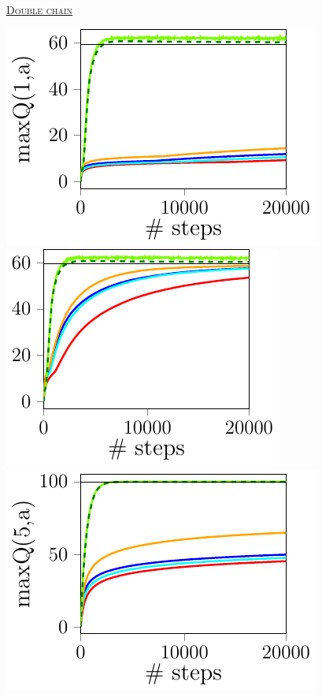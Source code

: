 \documentclass[portrait,a0paper,fontscale=0.312]{baposter}
\newcommand{\listhead}[1] {\textsc{\underline{#1}}}
\begin{document}
\begin{poster}
{\begin{minipage}{0.45\textwidth}
\begin{center}
\begin{minipage}{0.4\textwidth}
    \end{minipage}
  \end{center}
\end{minipage}
\begin{center}
  \listhead{Double chain}\\
  \vspace{0.25cm}
  \begin{minipage}{0.33\textwidth}
    \includegraphics[scale=0.55]{./imgs/doubleChain/v1-1.pdf}
    \includegraphics[scale=0.55]{./imgs/doubleChain/v1-51.pdf}\\
    \includegraphics[scale=0.55]{./imgs/doubleChain/v5-1.pdf}

\end{minipage}
\end{center}}
\end{poster}
\end{document}
